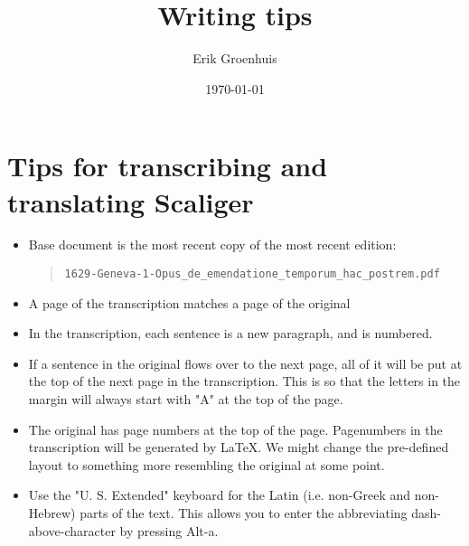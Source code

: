 \documentclass{report}
\title{Writing tips}
\author{Erik Groenhuis}
\date{\today}              %
\begin{document}
\maketitle

\tableofcontents{}




\chapter{Tips for transcribing and translating Scaliger}

\begin{itemize}
\item Base document is the most recent copy of the most recent edition:
\begin{quote}
  \verb+1629-Geneva-1-Opus_de_emendatione_temporum_hac_postrem.pdf+
\end{quote}
\item A page of the transcription matches a page of the original
\item In the transcription, each sentence is a new paragraph, and is numbered.
\item If a sentence in the original flows over to the next page, all of it will
 be put at the top of the next page in the transcription.  This is so that the
 letters in the margin will always start with "A" at the top of the page.
\item The original has page numbers at the top of the page. Pagenumbers in the
 transcription will be generated by LaTeX. We might change the pre-defined
 layout to something more resembling the original at some point.
\item Use the "U. S. Extended" keyboard for the Latin (i.e. non-Greek and
 non-Hebrew) parts of the text. This allows you to enter the abbreviating
 dash-above-character by pressing Alt-a.
\end{itemize}
\end{document}
